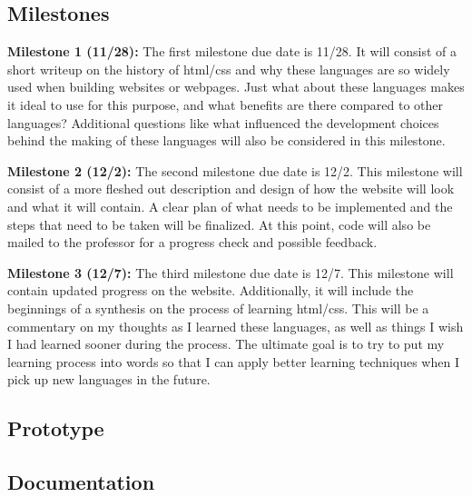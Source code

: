 \documentclass{article}
\theoremstyle{theorem}
\theoremstyle{definition}
\theoremstyle{remark}
\begin{document}
\subsection{Milestones}
\textbf{Milestone 1 (11/28):} 
\newline\indent
The first milestone due date is 11/28. It will consist of a short writeup on the history of html/css and why these languages are so widely used when building websites or webpages. Just what about these languages makes it ideal to use for this purpose, and what benefits are there compared to other languages? Additional questions like what influenced the development choices behind the making of these languages will also be considered in this milestone.\newline

\noindent\textbf{Milestone 2 (12/2):}
\newline\indent
The second milestone due date is 12/2. This milestone will consist of a more fleshed out description and design of how the website will look and what it will contain. A clear plan of what needs to be implemented and the steps that need to be taken will be finalized. At this point, code will also be mailed to the professor for a progress check and possible feedback.\newline

\noindent\textbf{Milestone 3 (12/7):}
\newline\indent
The third milestone due date is 12/7. This milestone will contain updated progress on the website. Additionally, it will include the beginnings of a synthesis on the process of learning html/css. This will be a commentary on my thoughts as I learned these languages, as well as things I wish I had learned sooner during the process. The ultimate goal is to try to put my learning process into words so that I can apply better learning techniques when I pick up new languages in the future.

\subsection{Prototype}
\subsection{Documentation}
\end{document}
